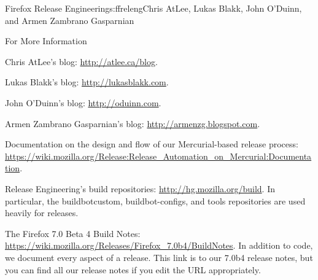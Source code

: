 \begin{aosachapter}{Firefox Release Engineering}{s:ffreleng}{Chris AtLee, Lukas Blakk, John O'Duinn, and Armen Zambrano Gasparnian}
\begin{aosasect1}{For More Information}
\begin{aosaitemize}  

\item Chris AtLee's blog: \url{http://atlee.ca/blog}.

\item Lukas Blakk's blog: \url{http://lukasblakk.com}.

\item John O'Duinn's blog: \url{http://oduinn.com}.

\item Armen Zambrano Gasparnian's blog: \url{http://armenzg.blogspot.com}.

\item Documentation on the design and flow of our Mercurial-based release process: \url{https://wiki.mozilla.org/Release:Release_Automation_on_Mercurial:Documentation}.

\item Release Engineering's build repositories:
  \url{http://hg.mozilla.org/build}.  In particular, the
  buildbotcustom, buildbot-configs, and tools repositories are used
  heavily for releases.

\item The Firefox 7.0 Beta 4 Build Notes:
  \url{https://wiki.mozilla.org/Releases/Firefox_7.0b4/BuildNotes}.
  In addition to code, we document every aspect of a release. This
  link is to our 7.0b4 release notes, but you can find all our release
  notes if you edit the URL appropriately.

\end{aosaitemize}

\end{aosasect1}

\end{aosachapter}
